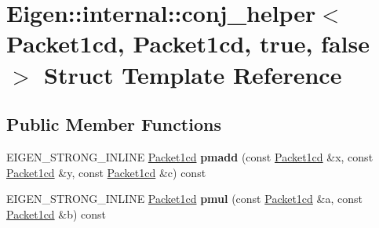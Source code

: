\hypertarget{struct_eigen_1_1internal_1_1conj__helper_3_01_packet1cd_00_01_packet1cd_00_01true_00_01false_01_4}{}\section{Eigen\+:\+:internal\+:\+:conj\+\_\+helper$<$ Packet1cd, Packet1cd, true, false $>$ Struct Template Reference}
\label{struct_eigen_1_1internal_1_1conj__helper_3_01_packet1cd_00_01_packet1cd_00_01true_00_01false_01_4}
\subsection*{Public Member Functions}
\begin{DoxyCompactItemize}
\item 
\mbox{\label{struct_eigen_1_1internal_1_1conj__helper_3_01_packet1cd_00_01_packet1cd_00_01true_00_01false_01_4_a7d2d447af001a9de6e0c310ec8dacf14}} 
E\+I\+G\+E\+N\+\_\+\+S\+T\+R\+O\+N\+G\+\_\+\+I\+N\+L\+I\+NE \hyperlink{struct_eigen_1_1internal_1_1_packet1cd}{Packet1cd} {\bfseries pmadd} (const \hyperlink{struct_eigen_1_1internal_1_1_packet1cd}{Packet1cd} \&x, const \hyperlink{struct_eigen_1_1internal_1_1_packet1cd}{Packet1cd} \&y, const \hyperlink{struct_eigen_1_1internal_1_1_packet1cd}{Packet1cd} \&c) const
\item 
\mbox{\label{struct_eigen_1_1internal_1_1conj__helper_3_01_packet1cd_00_01_packet1cd_00_01true_00_01false_01_4_af4aa2375a7954ed060d41bb27f60445a}} 
E\+I\+G\+E\+N\+\_\+\+S\+T\+R\+O\+N\+G\+\_\+\+I\+N\+L\+I\+NE \hyperlink{struct_eigen_1_1internal_1_1_packet1cd}{Packet1cd} {\bfseries pmul} (const \hyperlink{struct_eigen_1_1internal_1_1_packet1cd}{Packet1cd} \&a, const \hyperlink{struct_eigen_1_1internal_1_1_packet1cd}{Packet1cd} \&b) const
\item 
\mbox{\label{struct_eigen_1_1internal_1_1conj__helper_3_01_packet1cd_00_01_packet1cd_00_01true_00_01false_01_4_a7d2d447af001a9de6e0c310ec8dacf14}} 

\end{DoxyCompactItemize}
